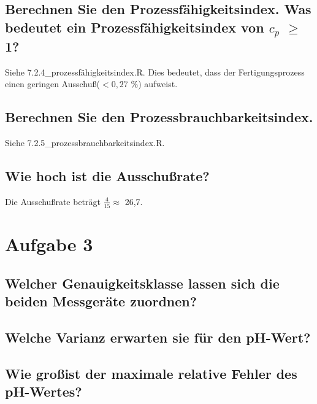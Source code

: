 \documentclass[12pt, a4paper, titlepage]{article}
\begin{document}
	 \subsection{Berechnen Sie den Prozessf\"ahigkeitsindex. Was bedeutet ein Prozessf\"ahigkeitsindex von $c_p$ $\ge$ 1?}
	 Siehe 7.2.4\_prozessf\"ahigkeitsindex.R.
	 Dies bedeutet, dass der Fertigungsprozess einen geringen Ausschu\ss  ($<0,27$ $\%$) aufweist.
	 
	 \subsection{Berechnen Sie den Prozessbrauchbarkeitsindex.}
	 Siehe 7.2.5\_prozessbrauchbarkeitsindex.R.
	 
	 \subsection{Wie hoch ist die Ausschu\ss rate?}
	 Die Ausschu\ss rate betr\"agt $\frac{4}{15} \approx$ 26,7.
	 
	 \section{Aufgabe 3}
	 \subsection{Welcher Genauigkeitsklasse lassen sich die beiden Messger\"ate zuordnen?}
	 
	 \subsection{Welche Varianz erwarten sie f\"ur den pH-Wert?}
	 
	 \subsection{Wie gro\ss ist der maximale relative Fehler des pH-Wertes?}
	
\end{document}
